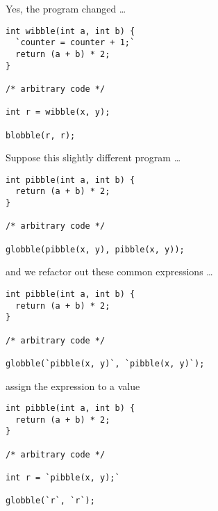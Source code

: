 \begin{frame}[fragile]
\begin{block}{Yes, the program changed \ldots}
\begin{lstlisting}[style=java]
int wibble(int a, int b) {
  `counter = counter + 1;`
  return (a + b) * 2;
}

/* arbitrary code */

int r = wibble(x, y);

blobble(r, r);
\end{lstlisting}
\end{block}
\end{frame}

\begin{frame}[fragile]
\begin{block}{Suppose this slightly different program \ldots}
\begin{lstlisting}[style=java]
int pibble(int a, int b) {
  return (a + b) * 2;
}

/* arbitrary code */

globble(pibble(x, y), pibble(x, y));
\end{lstlisting}
\end{block}
\end{frame}

\begin{frame}[fragile]
\begin{block}{and we refactor out these common expressions \ldots}
\begin{lstlisting}[style=java]
int pibble(int a, int b) {
  return (a + b) * 2;
}

/* arbitrary code */

globble(`pibble(x, y)`, `pibble(x, y)`);
\end{lstlisting}
\end{block}
\end{frame}

\begin{frame}[fragile]
\begin{block}{assign the expression to a value}
\begin{lstlisting}[style=java]
int pibble(int a, int b) {
  return (a + b) * 2;
}

/* arbitrary code */

int r = `pibble(x, y);`

globble(`r`, `r`);
\end{lstlisting}
\end{block}
\end{frame}

